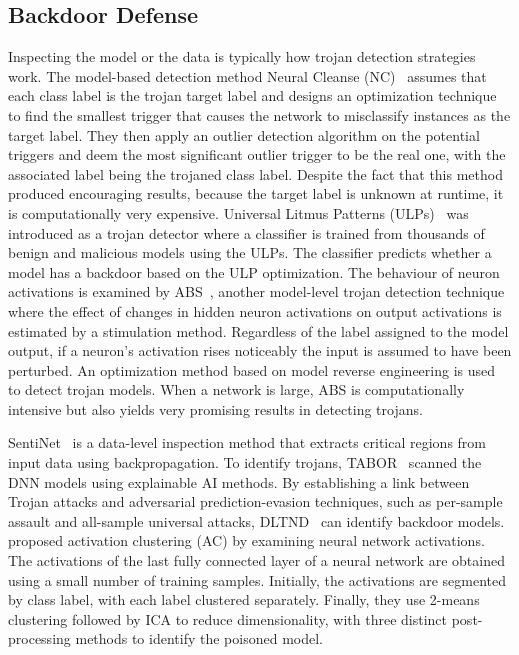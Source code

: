 \subsection{Backdoor Defense}
\label{sec:related-backdoor-defense}
    Inspecting the model or the data is typically how trojan detection strategies work. The model-based detection method Neural Cleanse (NC)~\cite{wang2019neural} assumes that each class label is the trojan target label and designs an optimization technique to find the smallest trigger that causes the network to misclassify instances as the target label. They then apply an outlier detection algorithm on the potential triggers and deem the most significant outlier trigger to be the real one, with the associated label being the trojaned class label. Despite the fact that this method produced encouraging results, because the target label is unknown at runtime, it is computationally very expensive. 
    Universal Litmus Patterns (ULPs)~\cite{Kolouri_2020_CVPR} was introduced as a trojan detector where a classifier is trained from thousands of benign and malicious models using the ULPs. The classifier predicts whether a model has a backdoor based on the ULP optimization. The behaviour of neuron activations is examined by ABS~\cite{liu2019abs}, another model-level trojan detection technique where the effect of changes in hidden neuron activations on output activations is estimated by a stimulation method. Regardless of the label assigned to the model output, if a neuron's activation rises noticeably the input is assumed to have been perturbed. An optimization method based on model reverse engineering is used to detect trojan models. When a network is large, ABS is computationally intensive but also yields very promising results in detecting trojans. 
    
    SentiNet~\cite{chou2020sentinet} is a data-level inspection method that extracts critical regions from input data using backpropagation. To identify trojans, TABOR~\cite{guo2019tabor} scanned the DNN models using explainable AI methods. By establishing a link between Trojan attacks and adversarial prediction-evasion techniques, such as per-sample assault and all-sample universal attacks, DLTND~\cite{wang2020practical}  can identify backdoor models.~\citet{chen2018detecting} proposed activation clustering (AC) by examining neural network activations. The activations of the last fully connected layer of a neural network are obtained using a small number of training samples. Initially, the activations are segmented by class label, with each label clustered separately. Finally, they use 2-means clustering followed by ICA to reduce dimensionality, with three distinct post-processing methods to identify the poisoned model.


